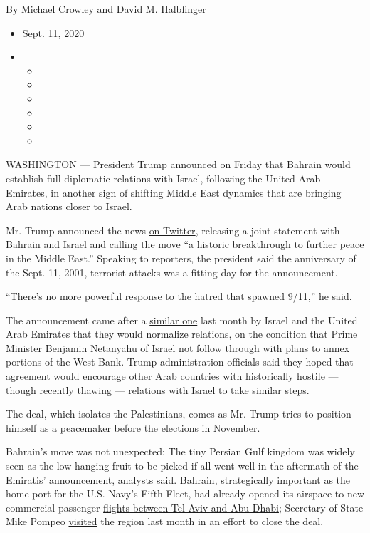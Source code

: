 By \href{https://www.nytimes3xbfgragh.onion/by/michael-crowley}{Michael
Crowley} and
\href{https://www.nytimes3xbfgragh.onion/by/david-m-halbfinger}{David M.
Halbfinger}

\begin{itemize}
\item
  Sept. 11, 2020
\item
  \begin{itemize}
  \item
  \item
  \item
  \item
  \item
  \item
  \end{itemize}
\end{itemize}

WASHINGTON --- President Trump announced on Friday that Bahrain would
establish full diplomatic relations with Israel, following the United
Arab Emirates, in another sign of shifting Middle East dynamics that are
bringing Arab nations closer to Israel.

Mr. Trump announced the news
\href{https://twitter.com/realDonaldTrump/status/1304464848831631361}{on
Twitter}, releasing a joint statement with Bahrain and Israel and
calling the move ``a historic breakthrough to further peace in the
Middle East.'' Speaking to reporters, the president said the anniversary
of the Sept. 11, 2001, terrorist attacks was a fitting day for the
announcement.

``There's no more powerful response to the hatred that spawned 9/11,''
he said.

The announcement came after a
\href{https://www.nytimes3xbfgragh.onion/2020/08/13/us/politics/trump-israel-united-arab-emirates-uae.html}{similar
one} last month by Israel and the United Arab Emirates that they would
normalize relations, on the condition that Prime Minister Benjamin
Netanyahu of Israel not follow through with plans to annex portions of
the West Bank. Trump administration officials said they hoped that
agreement would encourage other Arab countries with historically hostile
--- though recently thawing --- relations with Israel to take similar
steps.

The deal, which isolates the Palestinians, comes as Mr. Trump tries to
position himself as a peacemaker before the elections in November.

Bahrain's move was not unexpected: The tiny Persian Gulf kingdom was
widely seen as the low-hanging fruit to be picked if all went well in
the aftermath of the Emiratis' announcement, analysts said. Bahrain,
strategically important as the home port for the U.S. Navy's Fifth
Fleet, had already opened its airspace to new commercial passenger
\href{https://www.nytimes3xbfgragh.onion/2020/08/31/world/middleeast/israel-uae-flight.html}{flights
between Tel Aviv and Abu Dhabi}; Secretary of State Mike Pompeo
\href{https://www.nytimes3xbfgragh.onion/2020/08/24/world/middleeast/pompeo-jerusalem-rnc.html}{visited}
the region last month in an effort to close the deal.

